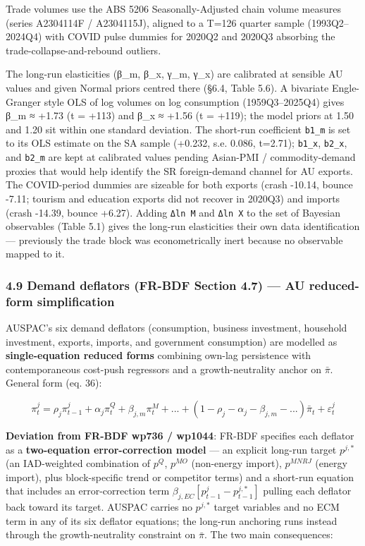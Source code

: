 \documentclass[
]{article}
\begin{document}
Trade volumes use the ABS 5206 Seasonally-Adjusted chain volume measures
(series A2304114F / A2304115J), aligned to a T=126 quarter sample
(1993Q2--2024Q4) with COVID pulse dummies for 2020Q2 and 2020Q3
absorbing the trade-collapse-and-rebound outliers.

The long-run elasticities (β\_m, β\_x, γ\_m, γ\_x) are calibrated at
sensible AU values and given Normal priors centred there (§6.4, Table
5.6). A bivariate Engle-Granger style OLS of log volumes on log
consumption (1959Q3--2025Q4) gives β\_m ≈ +1.73 (t = +113) and β\_x ≈
+1.56 (t = +119); the model priors at 1.50 and 1.20 sit within one
standard deviation. The short-run coefficient \texttt{b1\_m} is set to
its OLS estimate on the SA sample (+0.232, s.e. 0.086, t=2.71);
\texttt{b1\_x}, \texttt{b2\_x}, and \texttt{b2\_m} are kept at
calibrated values pending Asian-PMI / commodity-demand proxies that
would help identify the SR foreign-demand channel for AU exports. The
COVID-period dummies are sizeable for both exports (crash -10.14, bounce
-7.11; tourism and education exports did not recover in 2020Q3) and
imports (crash -14.39, bounce +6.27). Adding \texttt{Δln\ M} and
\texttt{Δln\ X} to the set of Bayesian observables (Table 5.1) gives the
long-run elasticities their own data identification --- previously the
trade block was econometrically inert because no observable mapped to
it.

\subsubsection{4.9 Demand deflators (FR-BDF Section 4.7) --- AU
reduced-form
simplification}\label{demand-deflators-fr-bdf-section-4.7-au-reduced-form-simplification}

AUSPAC's six demand deflators (consumption, business investment,
household investment, exports, imports, and government consumption) are
modelled as \textbf{single-equation reduced forms} combining own-lag
persistence with contemporaneous cost-push regressors and a
growth-neutrality anchor on \(\bar{\pi}\). General form (eq. 36):

\[\pi^j_t = \rho_j \pi^j_{t-1} + \alpha_j \pi^Q_t + \beta_{j,m} \pi^M_t + ... + (1 - \rho_j - \alpha_j - \beta_{j,m} - ...) \bar{\pi}_t + \varepsilon^j_t\]

\textbf{Deviation from FR-BDF wp736 / wp1044}: FR-BDF specifies each
deflator as a \textbf{two-equation error-correction model} --- an
explicit long-run target \(p^{j,\ast}\) (an IAD-weighted combination of
\(p^Q\), \(p^{MO}\) (non-energy import), \(p^{MNRJ}\) (energy import),
plus block-specific trend or competitor terms) and a short-run equation
that includes an error-correction term
\(\beta_{j,EC} [p^j_{t-1} - p^{j,\ast}_{t-1}]\) pulling each deflator
back toward its target. AUSPAC carries no \(p^{j,\ast}\) target
variables and no ECM term in any of its six deflator equations; the
long-run anchoring runs instead through the growth-neutrality constraint
on \(\bar{\pi}\). The two main consequences:
\end{document}
